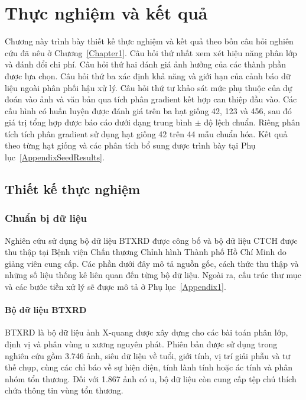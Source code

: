 \chapter{Thực nghiệm và kết quả}
\label{Chapter4}
Chương này trình bày thiết kế thực nghiệm và kết quả theo bốn câu hỏi nghiên cứu đã nêu ở Chương~\ref{Chapter1}. Câu hỏi thứ nhất xem xét hiệu năng phân lớp và đánh đổi chi phí. Câu hỏi thứ hai đánh giá ảnh hưởng của các thành phần được lựa chọn. Câu hỏi thứ ba xác định khả năng và giới hạn của cảnh báo dữ liệu ngoài phân phối hậu xử lý. Câu hỏi thứ tư khảo sát mức phụ thuộc của dự đoán vào ảnh và văn bản qua tích phân gradient kết hợp can thiệp đầu vào. Các cấu hình có huấn luyện được đánh giá trên ba hạt giống 42, 123 và 456, sau đó giá trị tổng hợp được báo cáo dưới dạng trung bình $\pm$ độ lệch chuẩn. Riêng phân tích tích phân gradient sử dụng hạt giống 42 trên 44 mẫu chuẩn hóa. Kết quả theo từng hạt giống và các phân tích bổ sung được trình bày tại Phụ lục~\ref{AppendixSeedResults}.

\section{Thiết kế thực nghiệm}
\label{sec:experimental_design}

\subsection{Chuẩn bị dữ liệu}
Nghiên cứu sử dụng bộ dữ liệu BTXRD \cite{Yao2025} được công bố và bộ dữ liệu CTCH được thu thập tại Bệnh viện Chấn thương Chỉnh hình Thành phố Hồ Chí Minh do giảng viên cung cấp. Các phần dưới đây mô tả nguồn gốc, cách thức thu thập và những số liệu thống kê liên quan đến từng bộ dữ liệu. Ngoài ra, cấu trúc thư mục và các bước tiền xử lý sẽ được mô tả ở Phụ lục~\ref{Appendix1}.

\subsubsection{Bộ dữ liệu BTXRD}
\label{subsec:btxrd-dataset}

BTXRD là bộ dữ liệu ảnh X-quang được xây dựng cho các bài toán phân lớp, định vị và phân vùng u xương nguyên phát. Phiên bản được sử dụng trong nghiên cứu gồm 3.746 ảnh, siêu dữ liệu về tuổi, giới tính, vị trí giải phẫu và tư thế chụp, cùng các chỉ báo về sự hiện diện, tính lành tính hoặc ác tính và phân nhóm tổn thương. Đối với 1.867 ảnh có u, bộ dữ liệu còn cung cấp tệp chú thích chứa thông tin vùng tổn thương.

